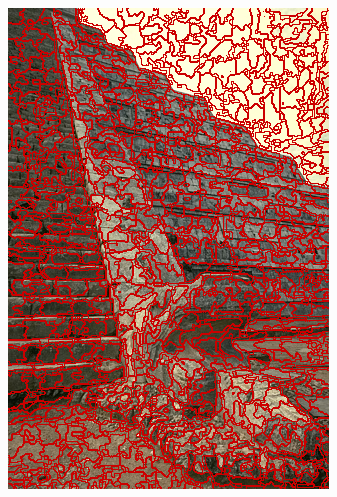 \begin{figure}
{		\includegraphics[scale=\scalefivebsdtest]{pictures/bsd-test-6-crs}
	}
	\subfigure{
}
\end{figure}
